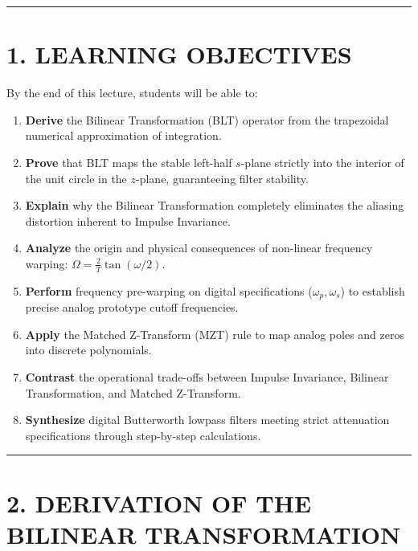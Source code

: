 \documentclass[11pt,a4paper]{article}
\begin{document}
\noindent\rule{\textwidth}{0.5pt}

\section{1. LEARNING OBJECTIVES}
By the end of this lecture, students will be able to:
\begin{enumerate}
    \item \textbf{Derive} the Bilinear Transformation (BLT) operator from the trapezoidal numerical approximation of integration.
    \item \textbf{Prove} that BLT maps the stable left-half $s$-plane strictly into the interior of the unit circle in the $z$-plane, guaranteeing filter stability.
    \item \textbf{Explain} why the Bilinear Transformation completely eliminates the aliasing distortion inherent to Impulse Invariance.
    \item \textbf{Analyze} the origin and physical consequences of non-linear frequency warping: $\Omega = \frac{2}{T}\tan(\omega/2)$.
    \item \textbf{Perform} frequency pre-warping on digital specifications ($\omega_p, \omega_s$) to establish precise analog prototype cutoff frequencies.
    \item \textbf{Apply} the Matched Z-Transform (MZT) rule to map analog poles and zeros into discrete polynomials.
    \item \textbf{Contrast} the operational trade-offs between Impulse Invariance, Bilinear Transformation, and Matched Z-Transform.
    \item \textbf{Synthesize} digital Butterworth lowpass filters meeting strict attenuation specifications through step-by-step calculations.
\end{enumerate}

\noindent\rule{\textwidth}{0.5pt}

\section{2. DERIVATION OF THE BILINEAR TRANSFORMATION}
\end{document}
